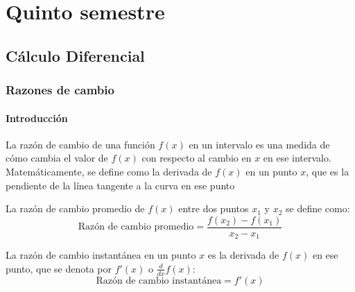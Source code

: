 \part{Quinto semestre}
\chapter{Cálculo Diferencial}

\section{Razones de cambio} %
\subsection{Introducción}
\begin{definition}
    La razón de cambio de una función \( f(x) \) en un intervalo es una medida de cómo cambia el valor de \( f(x) \) con respecto al cambio en \( x \) en ese intervalo. Matemáticamente, se define como la derivada de \( f(x) \) en un punto \( x \), que es la pendiente de la línea tangente a la curva en ese punto
\end{definition}
La razón de cambio promedio de \( f(x) \) entre dos puntos \( x_1 \) y \( x_2 \) se define como:
\[
\text{Razón de cambio promedio} = \frac{f(x_2) - f(x_1)}{x_2 - x_1}
\]

La razón de cambio instantánea en un punto \( x \) es la derivada de \( f(x) \) en ese punto, que se denota por \( f'(x) \) o \( \frac{d}{dx} f(x) \):
\[
\text{Razón de cambio instantánea} = f'(x)
\]

